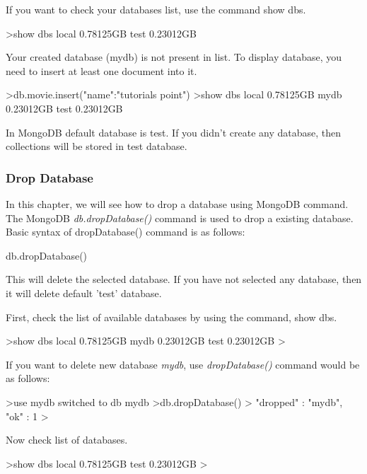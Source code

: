 \documentclass[12pt]{article}
\begin{document}
If you want to check your databases list, use the command show dbs.

\begin{bashcode}
>show dbs
local 0.78125GB
test 0.23012GB
\end{bashcode}

Your created database (mydb) is not present in list. To display
database, you need to insert at least one document into it.

\begin{bashcode}
>db.movie.insert({"name":"tutorials point"})
>show dbs
local      0.78125GB
mydb       0.23012GB
test       0.23012GB
\end{bashcode}

In MongoDB default database is test. If you didn't create any database,
then collections will be stored in test database.

\subsubsection{Drop Database}

In this chapter, we will see how to drop a database using MongoDB
command. The MongoDB \emph{db.dropDatabase()} command is used to drop a
existing database. Basic syntax of dropDatabase() command is as follows:

\begin{bashcode}
db.dropDatabase()
\end{bashcode}

This will delete the selected database. If you have not selected any
database, then it will delete default 'test' database.

First, check the list of available databases by using the command, show dbs.

\begin{bashcode}
>show dbs
local      0.78125GB
mydb       0.23012GB
test       0.23012GB
>
\end{bashcode}

If you want to delete new database \emph{mydb}, use
\emph{dropDatabase()} command would be as follows:

\begin{bashcode}
>use mydb
switched to db mydb
>db.dropDatabase()
>{ "dropped" : "mydb", "ok" : 1 }
>
\end{bashcode}

Now check list of databases.

\begin{bashcode}
>show dbs
local      0.78125GB
test       0.23012GB
>
\end{bashcode}
\end{document}
